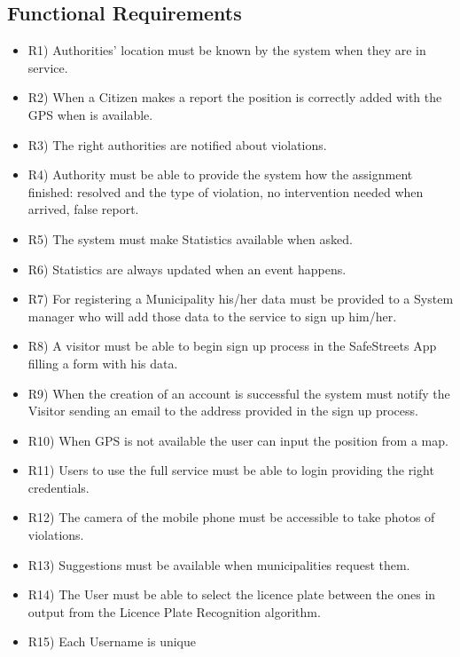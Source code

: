\subsection{Functional Requirements}
\begin{itemize}

 \item R1) Authorities’ location must be known by the system when they are in service.
\item  R2) When a Citizen makes a report the position is correctly added with the GPS when is available.
\item R3) The right authorities are notified about violations.
 \item R4)  Authority must be able to provide the system how the assignment finished: resolved and the type of violation, no intervention needed when arrived, false report.
 \item R5) The system must make Statistics available when asked.
 \item R6) Statistics are always updated when an event happens.  
\item R7) For registering a Municipality his/her data must be provided to a System manager who will add those data to the service to sign up him/her.
 \item R8) A visitor must be able to begin sign up process in the SafeStreets App filling a form with his data.
 \item R9) When the creation of an account is successful the system must notify the Visitor sending an email to the address provided in the sign up process. 
 \item R10) When GPS is not available the user can input the position from a map.
 \item R11) Users to use the full service must be able to login providing the right credentials.
\item R12) The camera of the mobile phone must be accessible to take photos of violations.
\item R13) Suggestions must be available when municipalities request them.
\item R14) The User must be able to select the licence plate between the ones in output from the Licence Plate Recognition algorithm.
\item R15) Each Username is unique
\end{itemize}
